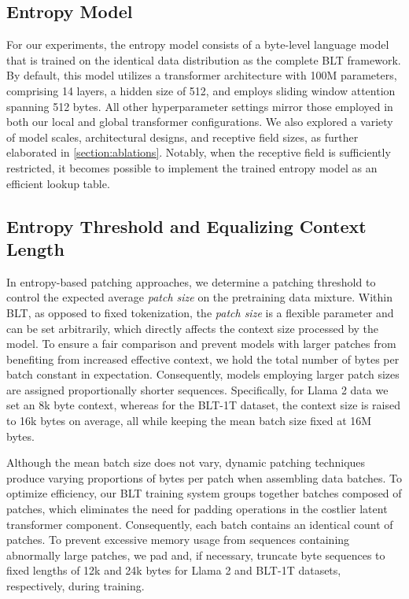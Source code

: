\subsection{Entropy Model} For our experiments, the entropy model consists of a byte-level language model that is trained on the identical data distribution as the complete {\textsc BLT} framework. By default, this model utilizes a transformer architecture with 100M parameters, comprising 14 layers, a hidden size of 512, and employs sliding window attention spanning 512 bytes. All other hyperparameter settings mirror those employed in both our local and global transformer configurations. We also explored a variety of model scales, architectural designs, and receptive field sizes, as further elaborated in \autoref{section:ablations}. Notably, when the receptive field is sufficiently restricted, it becomes possible to implement the trained entropy model as an efficient lookup table.

\subsection{Entropy Threshold and Equalizing Context Length} In entropy-based patching approaches, we determine a patching threshold to control the expected average \textit{patch size} on the pretraining data mixture. Within {\textsc BLT}, as opposed to fixed tokenization, the \textit{patch size} is a flexible parameter and can be set arbitrarily, which directly affects the context size processed by the model. To ensure a fair comparison and prevent models with larger patches from benefiting from increased effective context, we hold the total number of bytes per batch constant in expectation. Consequently, models employing larger patch sizes are assigned proportionally shorter sequences. Specifically, for Llama 2 data we set an 8k byte context, whereas for the {\textsc BLT}-1T dataset, the context size is raised to 16k bytes on average, all while keeping the mean batch size fixed at 16M bytes.

Although the mean batch size does not vary, dynamic patching techniques produce varying proportions of bytes per patch when assembling data batches. To optimize efficiency, our {\textsc BLT} training system groups together batches composed of patches, which eliminates the need for padding operations in the costlier latent transformer component. Consequently, each batch contains an identical count of patches. To prevent excessive memory usage from sequences containing abnormally large patches, we pad and, if necessary, truncate byte sequences to fixed lengths of 12k and 24k bytes for Llama 2 and {\textsc BLT}-1T datasets, respectively, during training.

